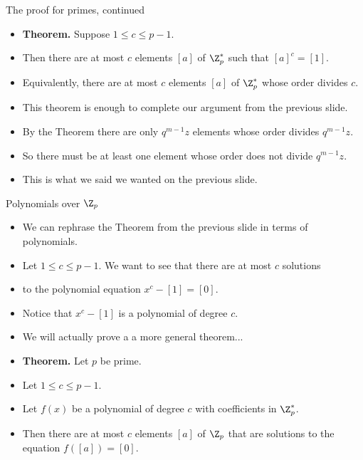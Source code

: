 \documentclass{beamer}
\begin{document}
\begin{frame}{The proof for primes, continued}

\begin{itemize}
  \item \textbf{Theorem.} Suppose $1\leq c \leq p-1$.
  \item Then there are at most $c$ elements $[a]$ of $\Z_p^*$ such that $[a]^c = [1]$.
  \item Equivalently, there are at most $c$ elements $[a]$ of $\Z_p^*$ whose order divides $c$.
  \item This theorem is enough to complete our argument from the previous slide.
  \item By the Theorem there are only $q^{m-1}z$ elements whose order divides $q^{m-1}z$.
  \item So there must be at least one element whose order does not divide $q^{m-1}z$.
  \item This is what we said we wanted on the previous slide.
\end{itemize}

\end{frame}

\begin{frame}{Polynomials over $\Z_p$}

\begin{itemize}
  \item We can rephrase the Theorem from the previous slide in terms of polynomials.
  \item Let $1\leq c \leq p-1$. We want to see that there are at most $c$ solutions
  \item to the polynomial equation $x^c-[1] = [0]$.
  \item Notice that $x^c-[1]$ is a polynomial of degree $c$.
  \item We will actually prove a a more general theorem...
  \item \textbf{Theorem.} Let $p$ be prime.
  \item Let $1\leq c \leq p-1$.
  \item Let $f(x)$ be a polynomial of degree $c$ with coefficients in $\Z_p^*$.
  \item Then there are at most $c$ elements $[a]$ of $\Z_p$ that are solutions to
  the equation $f([a])=[0]$.
\end{itemize}

\end{frame}
\end{document}
